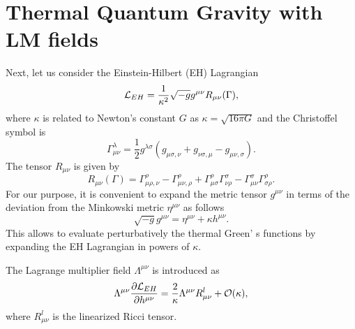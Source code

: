 \documentclass[longbibliography,groupedaddress,showpacs,showkeys,amssymb,eqsecnum,aps,nofootinbib,superscriptaddress]{revtex4}
\newcommand{\be}{\begin{equation}}
\newcommand{\ee}{\end{equation}}
\begin{document}
\section{Thermal Quantum Gravity with LM fields}
Next, let us consider the Einstein-Hilbert (EH) Lagrangian 
\be
{\cal L}_{EH} = \frac{1}{\kappa^2}\sqrt{-g} g^{\mu\nu} R_{\mu\nu}(\Gamma),
\ee
where $\kappa$ is related to Newton's constant $G$ 
as $\kappa=\sqrt{16\pi G}$ and the Christoffel symbol is 
\be
\Gamma^\lambda_{\mu\nu} = \frac 1 2
g^{\lambda\sigma}\left(
g_{\mu\sigma,\nu}+g_{\nu\sigma,\mu} - g_{\mu\nu,\sigma}
\right).
\ee
The tensor $R_{\mu\nu}$ is given by
\be
R_{\mu\nu}(\Gamma) = \Gamma^\rho_{\mu\rho,\nu} 
                                  -\Gamma^\rho_{\mu\nu,\rho} 
+\Gamma^\rho_{\mu\sigma} \Gamma^\sigma_{\nu\rho} 
-\Gamma^\sigma_{\mu\nu} \Gamma^\rho_{\sigma\rho}. 
\ee
For our purpose, it is convenient to expand the metric tensor        
$g^{\mu\nu}$
in terms of the deviation from the Minkowski metric       
$\eta^{\mu\nu}$
as follows 
\be
\sqrt{-g} g^{\mu\nu} = \eta^{\mu\nu}+\kappa h^{\mu\nu}.
\ee
This allows to evaluate perturbatively the thermal Green' s
functions by expanding the EH Lagrangian in powers of $\kappa$. 

The Lagrange multiplier field  
$\Lambda^{\mu\nu}$           
is introduced as 
\be
\Lambda^{\mu\nu}\frac{\partial {\cal L}_{EH}}{\partial h^{\mu\nu}}
=\frac{2}{\kappa} \Lambda^{\mu\nu} R^{l}_{\mu\nu} + {\cal O}(\kappa),
\ee
where $R^{l}_{\mu\nu}$ is the linearized Ricci tensor.
\end{document}
